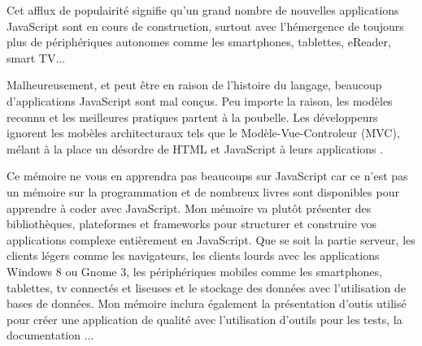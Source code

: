 Cet afflux de populairité signifie qu’un grand nombre de nouvelles applications JavaScript sont en cours de construction, surtout avec l’hémergence de toujours plus de périphériques autonomes comme les smartphones, tablettes, eReader, smart TV...

Malheureusement, et peut être en raison de l’histoire du langage, beaucoup d’applications JavaScript sont mal conçus. Peu importe la raison, les modèles reconnu et les meilleures pratiques partent à la poubelle. Les développeurs ignorent les mobèles architecturaux tels que le Modèle-Vue-Controleur (MVC), mélant à la place un désordre de HTML et JavaScript à leurs applications .

Ce mémoire ne vous en apprendra pas beaucoups sur JavaScript car ce n’est pas un mémoire sur la programmation et de nombreux livres sont disponibles pour apprendre à coder avec JavaScript. Mon mémoire va plutôt présenter des bibliothèques, plateformes et frameworks pour structurer et construire vos applications complexe entièrement en JavaScript. Que se soit  la partie serveur, les clients légers comme les navigateurs, les clients lourds avec les applications Windows 8 ou Gnome 3, les périphériques mobiles comme les smartphones, tablettes, tv connectés et liseuses et le stockage des données avec l’utilisation de bases de données. Mon mémoire inclura également la présentation d’outis utilisé pour créer une application de qualité avec l’utilisation d'outils pour les tests, la documentation ...

